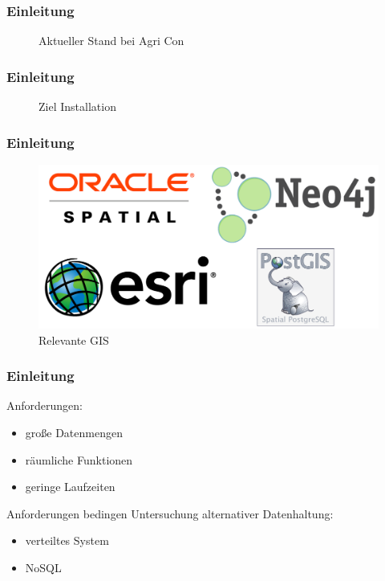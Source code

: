 \documentclass{beamer}
\begin{document}
\begin{frame}\frametitle{Einleitung}
\begin{figure}
\centering

\caption{Aktueller Stand bei Agri Con}
\end{figure}
\end{frame}

\begin{frame}\frametitle{Einleitung}
\begin{figure}[h!]
\centering
\resizebox{.92\linewidth}{!}{}
\caption{Ziel Installation}
\end{figure}
\end{frame}

\begin{frame}\frametitle{Einleitung}
\begin{figure}
\centering
\includegraphics[width=1\hsize]{Logos.png}
\caption{Relevante GIS}
\end{figure}
\end{frame}

\begin{frame}\frametitle{Einleitung}
\begin{block}{Anforderungen:}
\begin{itemize}
\item große Datenmengen
\item räumliche Funktionen
\item geringe Laufzeiten
\end{itemize}
\end{block}
\vspace{\baselineskip}
\vspace{\baselineskip}
\begin{block}{
Anforderungen bedingen Untersuchung alternativer Datenhaltung:}
\begin{itemize}
\item verteiltes System
\item NoSQL
\end{itemize}
\end{block}
\end{frame}
\end{document}
